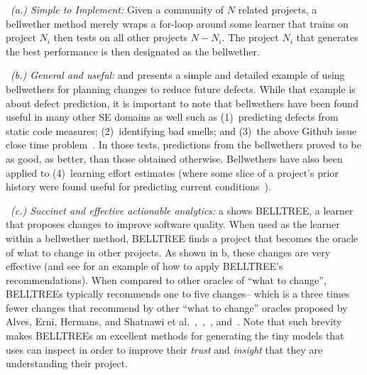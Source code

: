 ~{\em (a.) Simple to Implement:} Given a community
of $N$ related projects, a bellwether method 
merely wraps a for-loop around some learner that
trains on project $N_i$ then tests on all other projects $N-N_i$. The project $N_i$ that generates the best performance is then designated as the bellwether. 


~{\em (b.) General and useful:} 
 and  presents
a  simple and detailed example of using bellwethers for  planning changes to reduce
future defects.  While that example is about defect prediction,
it is important to note that  bellwethers have been
found useful in many other SE domains as well such as  (1)~predicting defects from static code measures; (2)~identifying bad smells; and (3)~the above Github issue close time problem~\cite{KrishnaMF16,krishna2018bellwethers}. In those tests,  predictions from the bellwethers proved to be as good, as better, than those obtained otherwise. Bellwethers have also been   applied  to (4)~learning effort estimates (where  some slice of a project's prior history were found  useful for predicting  current conditions~\cite{mensah2017investigating,mensah2017stratification,mensah18z}).



 

 
~{\em (c.) Succinct and effective actionable analytics:}
a shows BELLTREE, a learner 
that
proposes changes to improve software quality.  When used as
the learner within a bellwether method, BELLTREE
finds a project that becomes the
oracle of what to change in other projects.
As shown in b,
these changes are very effective
(and see    for an example of how to apply BELLTREE's recommendations).
When compared to other oracles of ``what to change'', BELLTREEs typically recommends
one to five changes-- which is a three times fewer
changes that recommend by other   ``what to change''
oracles proposed by  Alves, Erni, Hermans, and Shatnawi et al.~\cite{Al10},~\cite{Er96},~\cite{He15}, and~\cite{Sh10}.
Note that such brevity makes BELLTREEs an excellent methods for  generating the tiny models that uses can inspect
in order to improve   their {\em trust} and {\em insight} that they are understanding their project.



